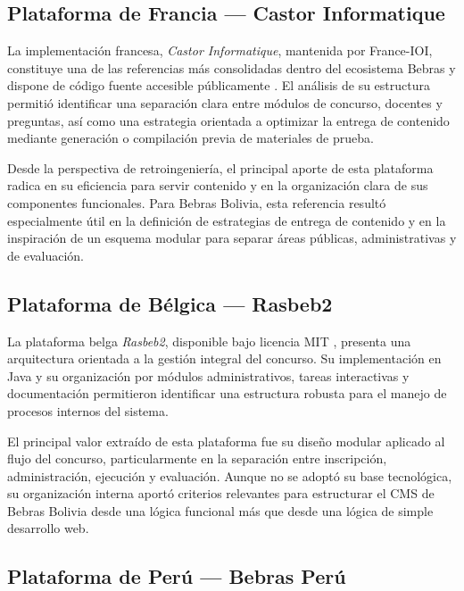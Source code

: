 \subsection{Plataforma de Francia --- Castor Informatique}

La implementación francesa, \emph{Castor Informatique}, mantenida por France-IOI, constituye una de las referencias más consolidadas dentro del ecosistema Bebras y dispone de código fuente accesible públicamente \parencite{bebrasfrancia}. El análisis de su estructura permitió identificar una separación clara entre módulos de concurso, docentes y preguntas, así como una estrategia orientada a optimizar la entrega de contenido mediante generación o compilación previa de materiales de prueba.

Desde la perspectiva de retroingeniería, el principal aporte de esta plataforma radica en su eficiencia para servir contenido y en la organización clara de sus componentes funcionales. Para Bebras Bolivia, esta referencia resultó especialmente útil en la definición de estrategias de entrega de contenido y en la inspiración de un esquema modular para separar áreas públicas, administrativas y de evaluación.

\subsection{Plataforma de Bélgica --- Rasbeb2}

La plataforma belga \emph{Rasbeb2}, disponible bajo licencia MIT \parencite{bebrasbelgica}, presenta una arquitectura orientada a la gestión integral del concurso. Su implementación en Java y su organización por módulos administrativos, tareas interactivas y documentación permitieron identificar una estructura robusta para el manejo de procesos internos del sistema.

El principal valor extraído de esta plataforma fue su diseño modular aplicado al flujo del concurso, particularmente en la separación entre inscripción, administración, ejecución y evaluación. Aunque no se adoptó su base tecnológica, su organización interna aportó criterios relevantes para estructurar el CMS de Bebras Bolivia desde una lógica funcional más que desde una lógica de simple desarrollo web.

\subsection{Plataforma de Perú --- Bebras Perú}

